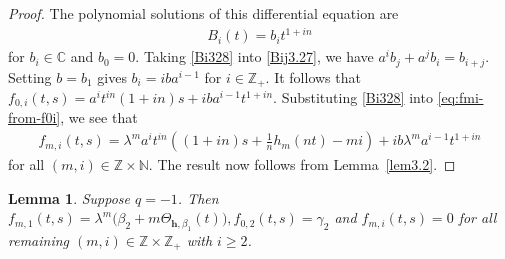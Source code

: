 \documentclass[a4paper]{amsart}
\numberwithin{equation}{section}
\newtheorem{lemma}[theorem]{Lemma}
\begin{document}
\begin{proof}
The polynomial solutions of this differential equation are
\begin{align}\label{Bi328}
   B_i(t)=b_it^{1+in}  
\end{align}  
for $b_i\in\mathbb{C}$ and $b_0=0$. Taking \eqref{Bi328} into \eqref{Bij3.27}, we have $a^ib_j+a^jb_i=b_{i+j}$. Setting $b=b_1$ gives
 $b_i=i b a^{i-1}$ for $i\in\mathbb Z_{+}$.
It follows that
$
f_{0,i}(t,s)=a^i t^{in}(1+in)s+i b a^{i-1}t^{1+in}.
$
Substituting \eqref{Bi328} into \eqref{eq:fmi-from-f0i}, we see that  
\begin{align*} 
f_{m,i}(t,s)
=
\lambda^m a^i t^{in}
\left((1+in)s+\frac1n h_m(nt)-mi\right)
+i b\lambda^m a^{i-1}t^{1+in} 
\end{align*} for all $(m,i)\in\mathbb{Z}\times\mathbb{N}$.
The result now follows from Lemma~\ref{lem3.2}.
\end{proof}



\begin{lemma}\label{lem:q-minus-one-L-action}
Suppose $q=-1$. Then
$
f_{m,1}(t,s)=\lambda^m\bigl(\beta_2+m\Theta_{\mathbf h,\beta_1}(t)\bigr), 
f_{0,2}(t,s)=\gamma_2
$
and
$
f_{m,i}(t,s)=0
$
for all remaining $(m,i)\in\mathbb Z\times\mathbb Z_+$ with $i\ge2$.
\end{lemma}
\end{document}
